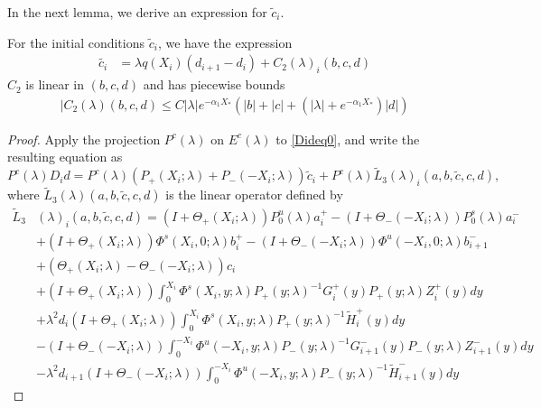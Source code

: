 \documentclass[thesis.tex]{subfiles}
\begin{document}
In the next lemma, we derive an expression for $\tilde{c}_i$.

\begin{lemma}\label{lemma:tildec1}
For the initial conditions $\tilde{c}_i$, we have the expression
\begin{align}\label{tildeciexp1}
\tilde{c_i} &= \lambda q(X_i) (d_{i+1} - d_i ) + C_2(\lambda)_i(b, c, d)
\end{align}
$C_2$ is linear in $(b, c, d)$ and has piecewise bounds
\begin{align}\label{C2bound}
|C_2(\lambda)(b, c, d) \leq C |\lambda| e^{-\alpha_1 X_*} \left( |b| + |c| + (|\lambda| + e^{-\alpha_1 X_*}) |d| \right)
\end{align}

\begin{proof}
Apply the projection $P^c(\lambda)$ on $E^c(
\lambda)$ to \eqref{Dideq0}, and write the resulting equation as
\begin{equation}\label{PcDid}
P^c(\lambda)D_i d = P^c(\lambda) (P_+(X_i; \lambda) + P_-(-X_i; \lambda))\tilde{c}_i + P^c(\lambda) \tilde{L}_3(\lambda)_i(a,b,\tilde{c},c,d),
\end{equation}
where $\tilde{L}_3(\lambda)(a,b,\tilde{c},c,d)$ is the linear operator defined by
\begin{align*}
\tilde{L}_3&(\lambda)_i(a,b,\tilde{c},c,d) = (I + \Theta_+(X_i; \lambda))P_0^u(\lambda) a_i^+ - (I + \Theta_-(-X_i; \lambda))P_0^s(\lambda)a_i^- \\
&+ (I + \Theta_+(X_i; \lambda))\Phi^s(X_i, 0; \lambda) b_i^+ - (I + \Theta_-(-X_i; \lambda))\Phi^u(-X_i, 0; \lambda) b_{i+1}^- \\
&+ (\Theta_+(X_i; \lambda) - \Theta_-(-X_i; \lambda))c_i  \\
&+ (I + \Theta_+(X_i; \lambda)) \int_0^{X_i} \Phi^s(X_i, y; \lambda) P_+(y; \lambda)^{-1} G_i^+(y) P_+(y; \lambda) Z_i^+(y) dy \\
&+ \lambda^2 d_i (I + \Theta_+(X_i; \lambda))  \int_0^{X_i} \Phi^s(X_i, y; \lambda) P_+(y; \lambda)^{-1} \tilde{H}_i^+(y) dy \\ 
&- (I + \Theta_-(-X_i; \lambda)) \int_0^{-X_i} \Phi^u(-X_i, y; \lambda) P_-(y; \lambda)^{-1} G_{i+1}^-(y) P_-(y; \lambda)Z_{i+1}^-(y) dy \\
&- \lambda^2 d_{i+1} (I + \Theta_-(-X_i; \lambda)) \int_0^{-X_i} \Phi^u(-X_i, y; \lambda) P_-(y; \lambda)^{-1} \tilde{H}_{i+1}^-(y) dy
\end{align*}


\end{proof}
\end{lemma}
\end{document}
